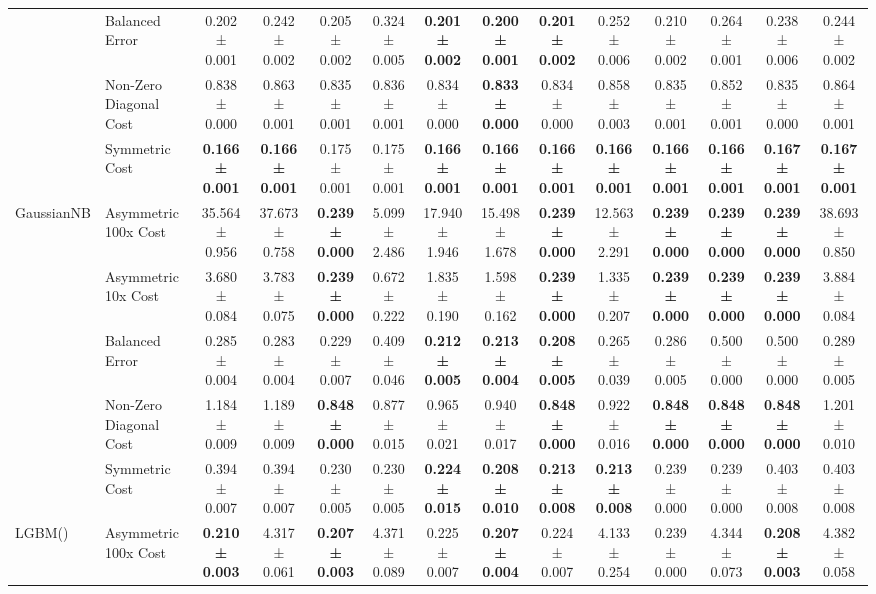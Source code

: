 \begin{table}[H]
{\begin{tabular}{llcccccccccccc}
 & Balanced Error & 0.202 ± 0.001 & 0.242 ± 0.002 & 0.205 ± 0.002 & 0.324 ± 0.005 & \textbf{0.201 ± 0.002} & \textbf{0.200 ± 0.001} & \textbf{0.201 ± 0.002} & 0.252 ± 0.006 & 0.210 ± 0.002 & 0.264 ± 0.001 & 0.238 ± 0.006 & 0.244 ± 0.002 \\
 & Non-Zero Diagonal Cost & 0.838 ± 0.000 & 0.863 ± 0.001 & 0.835 ± 0.001 & 0.836 ± 0.001 & 0.834 ± 0.000 & \textbf{0.833 ± 0.000} & 0.834 ± 0.000 & 0.858 ± 0.003 & 0.835 ± 0.001 & 0.852 ± 0.001 & 0.835 ± 0.000 & 0.864 ± 0.001 \\
 & Symmetric Cost & \textbf{0.166 ± 0.001} & \textbf{0.166 ± 0.001} & 0.175 ± 0.001 & 0.175 ± 0.001 & \textbf{0.166 ± 0.001} & \textbf{0.166 ± 0.001} & \textbf{0.166 ± 0.001} & \textbf{0.166 ± 0.001} & \textbf{0.166 ± 0.001} & \textbf{0.166 ± 0.001} & \textbf{0.167 ± 0.001} & \textbf{0.167 ± 0.001} \\
\cline{1-14}
\multirow[t]{5}{*}{GaussianNB} & Asymmetric 100x Cost & 35.564 ± 0.956 & 37.673 ± 0.758 & \textbf{0.239 ± 0.000} & 5.099 ± 2.486 & 17.940 ± 1.946 & 15.498 ± 1.678 & \textbf{0.239 ± 0.000} & 12.563 ± 2.291 & \textbf{0.239 ± 0.000} & \textbf{0.239 ± 0.000} & \textbf{0.239 ± 0.000} & 38.693 ± 0.850 \\
 & Asymmetric 10x Cost & 3.680 ± 0.084 & 3.783 ± 0.075 & \textbf{0.239 ± 0.000} & 0.672 ± 0.222 & 1.835 ± 0.190 & 1.598 ± 0.162 & \textbf{0.239 ± 0.000} & 1.335 ± 0.207 & \textbf{0.239 ± 0.000} & \textbf{0.239 ± 0.000} & \textbf{0.239 ± 0.000} & 3.884 ± 0.084 \\
 & Balanced Error & 0.285 ± 0.004 & 0.283 ± 0.004 & 0.229 ± 0.007 & 0.409 ± 0.046 & \textbf{0.212 ± 0.005} & \textbf{0.213 ± 0.004} & \textbf{0.208 ± 0.005} & 0.265 ± 0.039 & 0.286 ± 0.005 & 0.500 ± 0.000 & 0.500 ± 0.000 & 0.289 ± 0.005 \\
 & Non-Zero Diagonal Cost & 1.184 ± 0.009 & 1.189 ± 0.009 & \textbf{0.848 ± 0.000} & 0.877 ± 0.015 & 0.965 ± 0.021 & 0.940 ± 0.017 & \textbf{0.848 ± 0.000} & 0.922 ± 0.016 & \textbf{0.848 ± 0.000} & \textbf{0.848 ± 0.000} & \textbf{0.848 ± 0.000} & 1.201 ± 0.010 \\
 & Symmetric Cost & 0.394 ± 0.007 & 0.394 ± 0.007 & 0.230 ± 0.005 & 0.230 ± 0.005 & \textbf{0.224 ± 0.015} & \textbf{0.208 ± 0.010} & \textbf{0.213 ± 0.008} & \textbf{0.213 ± 0.008} & 0.239 ± 0.000 & 0.239 ± 0.000 & 0.403 ± 0.008 & 0.403 ± 0.008 \\
\cline{1-14}
\multirow[t]{5}{*}{LGBM()} & Asymmetric 100x Cost & \textbf{0.210 ± 0.003} & 4.317 ± 0.061 & \textbf{0.207 ± 0.003} & 4.371 ± 0.089 & 0.225 ± 0.007 & \textbf{0.207 ± 0.004} & 0.224 ± 0.007 & 4.133 ± 0.254 & 0.239 ± 0.000 & 4.344 ± 0.073 & \textbf{0.208 ± 0.003} & 4.382 ± 0.058 \\

\end{tabular}}
\end{table}
